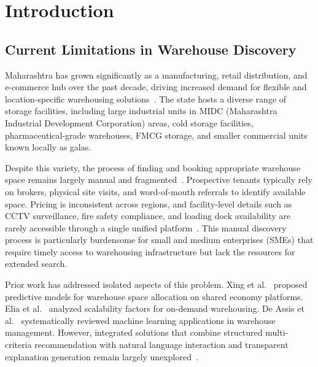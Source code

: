 \documentclass[pdflatex,sn-mathphys-num]{sn-jnl}
\theoremstyle{thmstyleone}
\theoremstyle{thmstyletwo}
\theoremstyle{thmstylethree}
\begin{document}

\maketitle


\section{Introduction}\label{sec1}

\subsection{Current Limitations in Warehouse Discovery}\label{subsec:limitations}

Maharashtra has grown significantly as a manufacturing, retail distribution, and e-commerce hub over the past decade, driving increased demand for flexible and location-specific warehousing solutions~\cite{b5, b8}. The state hosts a diverse range of storage facilities, including large industrial units in MIDC (Maharashtra Industrial Development Corporation) areas, cold storage facilities, pharmaceutical-grade warehouses, FMCG storage, and smaller commercial units known locally as galas.

Despite this variety, the process of finding and booking appropriate warehouse space remains largely manual and fragmented~\cite{b1, b2}. Prospective tenants typically rely on brokers, physical site visits, and word-of-mouth referrals to identify available space. Pricing is inconsistent across regions, and facility-level details such as CCTV surveillance, fire safety compliance, and loading dock availability are rarely accessible through a single unified platform~\cite{b5}. This manual discovery process is particularly burdensome for small and medium enterprises (SMEs) that require timely access to warehousing infrastructure but lack the resources for extended search.

Prior work has addressed isolated aspects of this problem. Xing et al.~\cite{b1} proposed predictive models for warehouse space allocation on shared economy platforms. Elia et al.~\cite{b5} analyzed scalability factors for on-demand warehousing. De Assis et al.~\cite{b10} systematically reviewed machine learning applications in warehouse management. However, integrated solutions that combine structured multi-criteria recommendation with natural language interaction and transparent explanation generation remain largely unexplored~\cite{b4, b8}.
\end{document}
